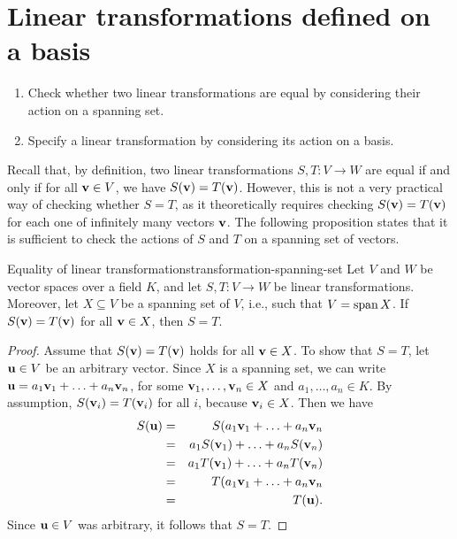 \section{Linear transformations defined on a basis}

\begin{outcome}
  \begin{enumerate}
  \item Check whether two linear transformations are equal by
    considering their action on a spanning set.
  \item Specify a linear transformation by considering its action on a
    basis.
  \end{enumerate}
\end{outcome}

Recall that, by definition, two linear transformations $S,T:V\to W$
are equal if and only if for all $\mbox{\bf v}\in V$, we have
$S(\mbox{\bf v}) = T(\mbox{\bf v})$.  However, this is not a very practical
way of checking whether $S=T$, as it theoretically requires checking
$S(\mbox{\bf v}) = T(\mbox{\bf v})$ for each one of infinitely many vectors
$\mbox{\bf v}$. The following proposition states that it is sufficient to
check the actions of $S$ and $T$ on a spanning set of vectors.

\begin{proposition}{Equality of linear transformations}{transformation-spanning-set}
  Let $V$ and $W$ be vector spaces over a field $K$, and let
  $S,T:V\to W$ be linear transformations. Moreover, let $X\subseteq V$
  be a spanning set of $V$, i.e., such that $V=\sspan X$.
  If $S(\mbox{\bf v}) = T(\mbox{\bf v})$ for all $\mbox{\bf v}\in X$, then $S=T$.%
\end{proposition}

\begin{proof}
  Assume that $S(\mbox{\bf v}) = T(\mbox{\bf v})$ holds for all $\mbox{\bf v}\in X$. To
  show that $S=T$, let $\mbox{\bf u}\in V$ be an arbitrary vector. Since
  $X$ is a spanning set, we can write
  $\mbox{\bf u}=a_1\mbox{\bf v}_1+\ldots+a_n\mbox{\bf v}_n$, for some
  $\mbox{\bf v}_1,\ldots,\mbox{\bf v}_n\in X$ and $a_1,\ldots,a_n\in K$.
  By assumption, $S(\mbox{\bf v}_i) = T(\mbox{\bf v}_i)$ for all $i$, because
  $\mbox{\bf v}_i\in X$. Then we have
  \begin{eqnarray*}
    S(\mbox{\bf u})
    &=& S(a_1\mbox{\bf v}_1+\ldots+a_n\mbox{\bf v}_n \\
    &=& a_1S(\mbox{\bf v}_1)+\ldots+a_nS(\mbox{\bf v}_n) \\
    &=& a_1T(\mbox{\bf v}_1)+\ldots+a_nT(\mbox{\bf v}_n) \\
    &=& T(a_1\mbox{\bf v}_1+\ldots+a_n\mbox{\bf v}_n \\
    &=& T(\mbox{\bf u}).
  \end{eqnarray*}
  Since $\mbox{\bf u}\in V$ was arbitrary, it follows that $S=T$.
\end{proof}

